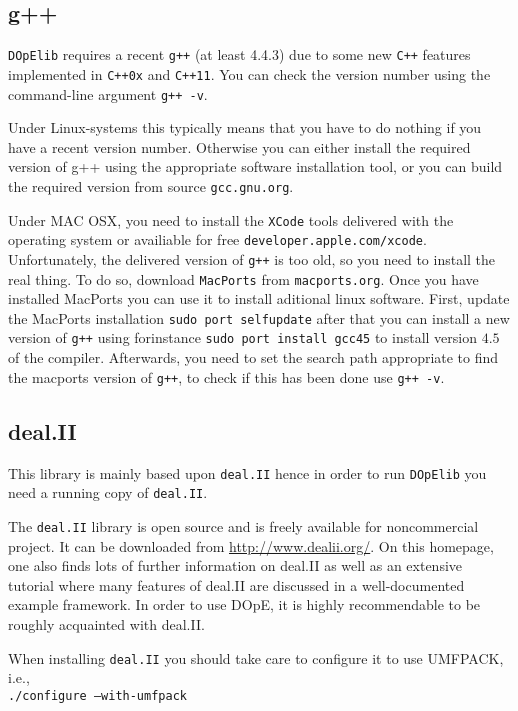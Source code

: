 \subsection{g++}
\texttt{DOpElib} requires a recent \texttt{g++} (at least 4.4.3) due to 
some new \texttt{C++} features implemented in \texttt{C++0x} and \texttt{C++11}. 
You can check the version number using the command-line argument \texttt{g++ -v}.

Under Linux-systems this typically means that you have to do nothing if you have a recent 
version number. Otherwise you can either install the required version of g++ using the 
appropriate software installation tool, or you can build the required version from 
source \texttt{gcc.gnu.org}.

Under MAC OSX, you need to install the \texttt{XCode} tools delivered with the operating system 
or availiable for free \texttt{developer.apple.com/xcode}. Unfortunately, the delivered 
version of \texttt{g++} is too old, so you need to install the real thing. To do so, 
download \texttt{MacPorts} from \texttt{macports.org}. Once you have installed MacPorts 
you can use it to install aditional linux software. 
First, update the MacPorts installation \texttt{sudo port selfupdate}
after that you can install a new version of \texttt{g++} using forinstance 
\texttt{sudo port install gcc45} to install version $4.5$ of the compiler.
Afterwards, you need to set the search path appropriate to find the macports version
of \texttt{g++}, to check if this has been done use \texttt{g++ -v}.

\subsection{deal.II}
This library is mainly based upon \texttt{deal.II} hence in order to run 
\texttt{DOpElib} you need a running copy of \texttt{deal.II}.

The \texttt{deal.II} library is open source and is freely available for noncommercial project.
It can be downloaded from \url{http://www.dealii.org/}. On this
homepage, one also finds lots of further information on deal.II as well as
an extensive tutorial where many features of deal.II are discussed in a
well-documented example framework. In order to use DOpE, it is highly
recommendable to be roughly acquainted with deal.II.

When installing \texttt{deal.II} you should take care to configure 
it to use UMFPACK, i.e.,\\
\texttt{./configure --with-umfpack}

